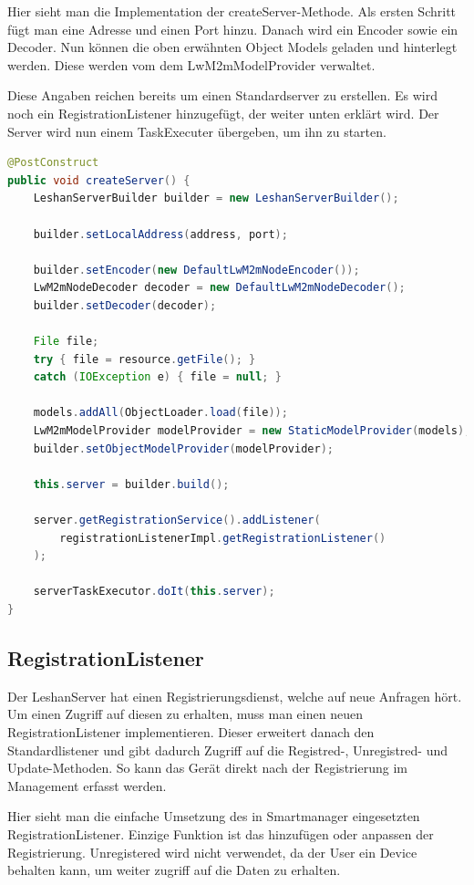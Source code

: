 Hier sieht man die Implementation der createServer-Methode. Als ersten Schritt fügt man eine Adresse und einen Port hinzu. Danach wird ein Encoder sowie ein Decoder. Nun können die oben erwähnten Object Models geladen und hinterlegt werden. Diese werden vom dem LwM2mModelProvider verwaltet.

Diese Angaben reichen bereits um einen Standardserver zu erstellen. Es wird noch ein RegistrationListener hinzugefügt, der weiter unten erklärt wird. Der Server wird nun einem TaskExecuter übergeben, um ihn zu starten.

\begin{lstlisting}[language=java]
@PostConstruct
public void createServer() {
	LeshanServerBuilder builder = new LeshanServerBuilder();

	builder.setLocalAddress(address, port);
		
	builder.setEncoder(new DefaultLwM2mNodeEncoder());
	LwM2mNodeDecoder decoder = new DefaultLwM2mNodeDecoder();
	builder.setDecoder(decoder);

	File file;
	try { file = resource.getFile(); } 
	catch (IOException e) { file = null; }

	models.addAll(ObjectLoader.load(file));
	LwM2mModelProvider modelProvider = new StaticModelProvider(models);
	builder.setObjectModelProvider(modelProvider);

	this.server = builder.build();
		
	server.getRegistrationService().addListener(
		registrationListenerImpl.getRegistrationListener()
	);
		
	serverTaskExecutor.doIt(this.server);
}
\end{lstlisting}
 \newpage

\subsection{RegistrationListener}
Der LeshanServer hat einen Registrierungsdienst, welche auf neue Anfragen hört. Um einen Zugriff auf diesen zu erhalten, muss man einen neuen RegistrationListener implementieren. Dieser erweitert danach den Standardlistener und gibt dadurch Zugriff auf die Registred-, Unregistred- und Update-Methoden. So kann das Gerät direkt nach der Registrierung im Management erfasst werden. 

Hier sieht man die einfache Umsetzung des in Smartmanager eingesetzten RegistrationListener. Einzige Funktion ist das hinzufügen oder anpassen der Registrierung. Unregistered wird nicht verwendet, da der User ein Device behalten kann, um weiter zugriff auf die Daten zu erhalten. 

